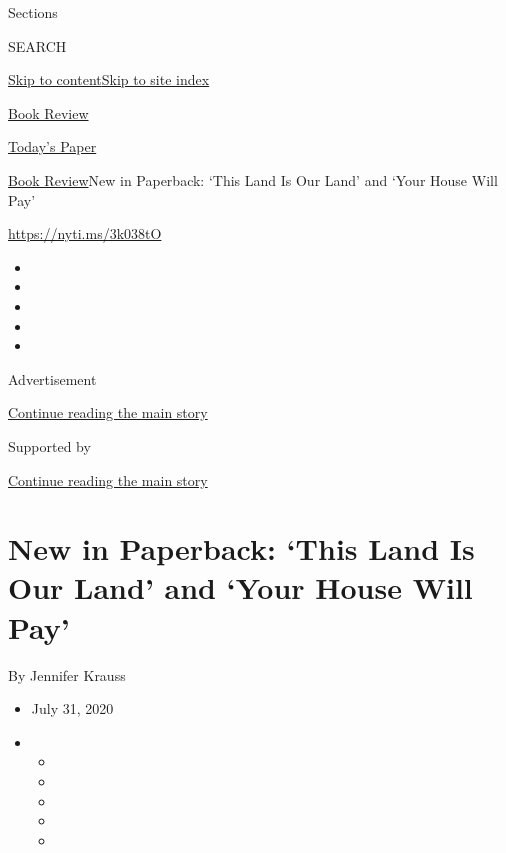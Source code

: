 Sections

SEARCH

\protect\hyperlink{site-content}{Skip to
content}\protect\hyperlink{site-index}{Skip to site index}

\href{https://www.nytimes3xbfgragh.onion/section/books/review}{Book
Review}

\href{https://myaccount.nytimes3xbfgragh.onion/auth/login?response_type=cookie\&client_id=vi}{}

\href{https://www.nytimes3xbfgragh.onion/section/todayspaper}{Today's
Paper}

\href{/section/books/review}{Book Review}\textbar{}New in Paperback:
`This Land Is Our Land' and `Your House Will Pay'

\url{https://nyti.ms/3k038tO}

\begin{itemize}
\item
\item
\item
\item
\item
\end{itemize}

Advertisement

\protect\hyperlink{after-top}{Continue reading the main story}

Supported by

\protect\hyperlink{after-sponsor}{Continue reading the main story}

\hypertarget{new-in-paperback-this-land-is-our-land-and-your-house-will-pay}{%
\section{New in Paperback: `This Land Is Our Land' and `Your House Will
Pay'}\label{new-in-paperback-this-land-is-our-land-and-your-house-will-pay}}

By Jennifer Krauss

\begin{itemize}
\item
  July 31, 2020
\item
  \begin{itemize}
  \item
  \item
  \item
  \item
  \item
  \end{itemize}
\end{itemize}

